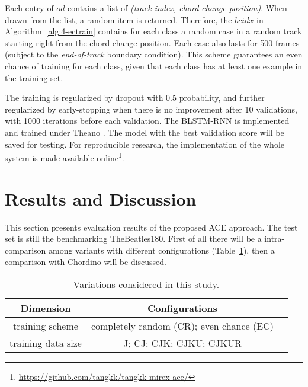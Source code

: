 Each entry of $od$ contains a list of \textit{(track index, chord change position)}. When drawn from the list, a random item is returned. Therefore, the $bcidx$ in Algorithm~\ref{alg:4-ectrain} contains for each class a random case in a random track starting right from the chord change position. Each case also lasts for 500 frames (subject to the \textit{end-of-track} boundary condition). This scheme guarantees an even chance of training for each class, given that each class has at least one example in the training set.

The training is regularized by dropout with 0.5 probability, and further regularized by early-stopping when there is no improvement after 10 validations, with 1000 iterations before each validation. The BLSTM-RNN is implemented and trained under Theano \cite{bergstra2011theano}. The model with the best validation score will be saved for testing. For reproducible research, the implementation of the whole system is made available online\footnote{\url{https://github.com/tangkk/tangkk-mirex-ace/}}.

\section{Results and Discussion}\label{sec:4-eval}
This section presents evaluation results of the proposed ACE approach. The test set is still the benchmarking TheBeatles180. First of all there will be a intra-comparison among variants with different configurations (Table~\ref{tab:4-varexplore}), then a comparison with Chordino will be discussed.

\begin{table}
\caption{Variations considered in this study.}
\centering
\footnotesize
\begin{tabular}{|c|c|c|} \hline
Dimension & Configurations \\ \hline
training scheme & completely random (CR); even chance (EC) \\ \hline
training data size & J; CJ; CJK; CJKU; CJKUR \\ \hline
\end{tabular}
\label{tab:4-varexplore}
\end{table}

